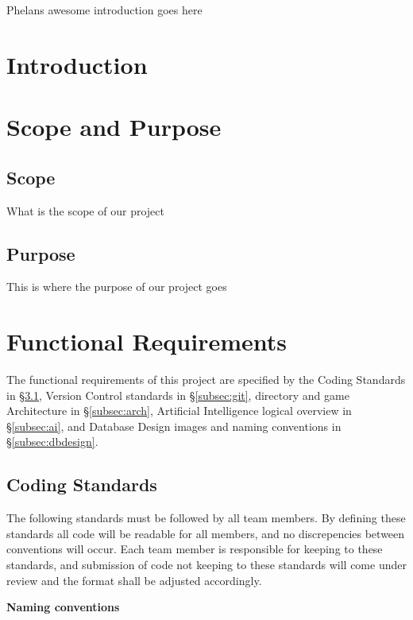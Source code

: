 \documentclass[12pt]{IEEEtran}
\begin{document}
	Phelans awesome introduction goes here

\section{Introduction}
\label{sec:introduction}

\section{Scope and Purpose}
\label{sec:scope}

\subsection{Scope}
\label{subsec:scope}

What is the scope of our project

\subsection{Purpose}
\label{subsec:purpose}

This is where the purpose of our project goes

\section{Functional Requirements}
\label{sec:funcReq}
	The functional requirements of this project are specified by the Coding Standards in \S \ref{subsec:coding}, Version Control standards in \S \ref{subsec:git}, directory and game Architecture in \S 				\ref{subsec:arch}, Artificial Intelligence logical overview in \S \ref{subsec:ai}, and Database Design images and naming conventions in \S \ref{subsec:dbdesign}.


\subsection{Coding Standards}
\label{subsec:coding}

	The following standards must be followed by all team members. By defining these standards all code will be readable for all members, and no discrepencies between conventions will occur. Each team member is 		responsible for keeping to these standards, and submission of code not keeping to these standards will come under review and the format shall be adjusted accordingly. 

	\bfseries Naming conventions \mdseries
\end{document}
